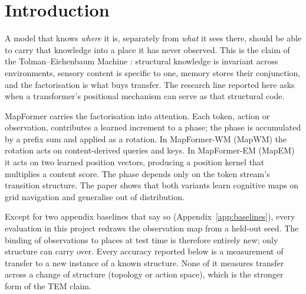 \documentclass[10pt]{article}
\begin{document}
\setcounter{tocdepth}{1}
\tableofcontents
\clearpage

\section{Introduction}
\label{sec:intro}

A model that knows \emph{where} it is, separately from \emph{what} it sees there, should be able to
carry that knowledge into a place it has never observed. This is the claim of the
Tolman--Eichenbaum Machine \citep{whittington2020tem}: structural knowledge is invariant across
environments, sensory content is specific to one, memory stores their conjunction, and the
factorisation is what buys transfer. The research line reported here asks when a transformer's
positional mechanism can serve as that structural code.

MapFormer \citep{rambaud2025mapformer} carries the factorisation into attention. Each token, action
or observation, contributes a learned increment to a phase; the phase is accumulated by a prefix
sum and applied as a rotation. In MapFormer-WM (MapWM) the rotation acts on content-derived queries
and keys. In MapFormer-EM (MapEM) it acts on two learned position vectors, producing a position
kernel that multiplies a content score. The phase depends only on the token stream's transition
structure. The paper shows that both variants learn cognitive maps on grid navigation and
generalise out of distribution.

Except for two appendix baselines that say so (Appendix~\ref{app:baselines}), every evaluation in this project
redraws the observation map from a held-out seed. The binding of
observations to places at test time is therefore entirely new; only structure can carry over. Every
accuracy reported below is a measurement of transfer to a new instance of a known structure. None
of it measures transfer across a change of structure (topology or action space), which is the
stronger form of the TEM claim.
\end{document}
